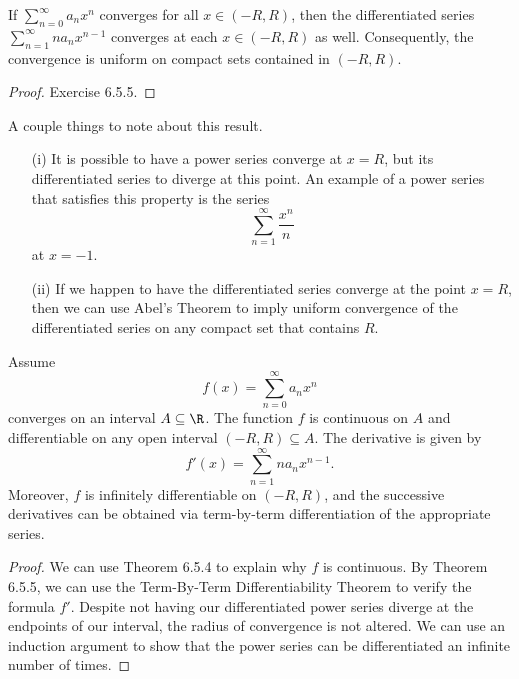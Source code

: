 \begin{tcolorbox}
\begin{thm}
    If \( \sum_{ n=0  }^{  \infty  } a_n x^n  \) converges for all \( x \in (-R , R ) \), then the differentiated series \( \sum_{ n=1  }^{  \infty  } na_n x^{n-1} \) converges at each \( x \in (-R , R ) \) as well. Consequently, the convergence is uniform on compact sets contained in \( (-R , R ) \).
\end{thm}
\end{tcolorbox}

\begin{proof}
Exercise 6.5.5.
\end{proof}

A couple things to note about this result.
\begin{enumerate}
    \item[(i)] It is possible to have a power series converge at \( x =R  \), but its differentiated series to diverge at this point. An example of a power series that satisfies this property is the series 
        \[  \sum_{ n=1  }^{  \infty  } \frac{ x^n  }{ n } \]
        at \( x = -1  \). 
    \item[(ii)] If we happen to have the differentiated series converge at the point \( x = R  \), then we can use Abel's Theorem to imply uniform convergence of the differentiated series on any compact set that contains \( R  \).
\end{enumerate}

\begin{tcolorbox}
\begin{thm}
Assume 
\[  f(x) = \sum_{ n=0 }^{ \infty  } a_n x^n  \] converges on an interval \( A \subseteq \R  \). The function \( f  \) is continuous on \( A  \) and differentiable on any open interval \( (-R , R ) \subseteq A \). The derivative is given by 
\[  f'(x) = \sum_{ n=1  }^{  \infty  } n a_n x^{n-1}. \]
Moreover, \( f  \) is infinitely differentiable on \( (-R ,R ) \), and the successive derivatives can be obtained via term-by-term differentiation of the appropriate series.
\end{thm}
\end{tcolorbox}

\begin{proof}
We can use Theorem 6.5.4 to explain why \( f  \) is continuous. By Theorem 6.5.5, we can use the Term-By-Term Differentiability Theorem to verify the formula \( f' \). Despite not having our differentiated power series diverge at the endpoints of our interval, the radius of convergence is not altered. We can use an induction argument to show that the power series can be differentiated an infinite number of times.
\end{proof}

